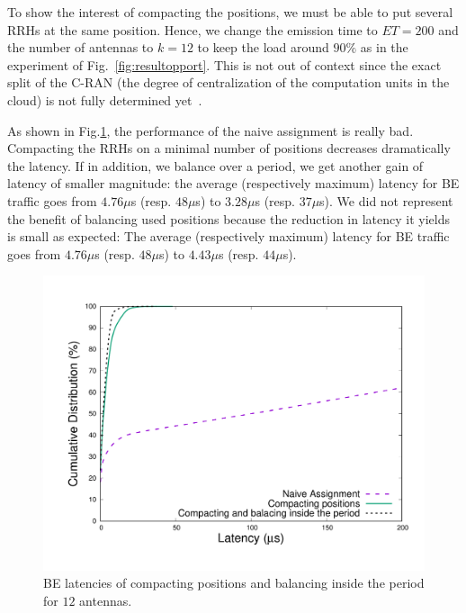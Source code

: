 \documentclass[10pt, conference, letterpaper]{IEEEtran}
\begin{document}
To show the interest of compacting the positions, we must be able to put several RRHs at the same position.
Hence, we change the emission time to $ET = 200$ and the number of antennas to $k = 12$ to keep the load around $90\%$ as in the experiment of Fig.~\ref{fig:resultopport}. This is not out of context since the exact split of the C-RAN (the degree of centralization of the computation units in the cloud) is not fully determined yet~\cite{mobile2011c}. 



As shown in Fig.\ref{fig:algocmp}, the performance of the naive assignment is really bad. Compacting the RRHs on a minimal number of positions decreases dramatically the latency. If in addition, we balance over a period, we get another gain of latency of smaller magnitude: the average (respectively maximum) latency for BE traffic goes from $4.76 \mu$s (resp. $48 \mu$s) to $3.28 \mu$s (resp. $37 \mu$s).
We did not represent the benefit of balancing used positions because the reduction in latency it yields is small as expected: The average (respectively maximum) latency for BE traffic goes from $4.76 \mu$s (resp. $48 \mu$s) to $4.43 \mu$s (resp. $44 \mu$s). 

\begin{figure}[h!]
\begin{center}   
      \includegraphics[scale=0.25]{repart1res}
     \caption{BE latencies of compacting positions and balancing inside the period for $12$ antennas.}   \label{fig:algocmp}
\end{center}
  \end{figure}
  
\end{document}
